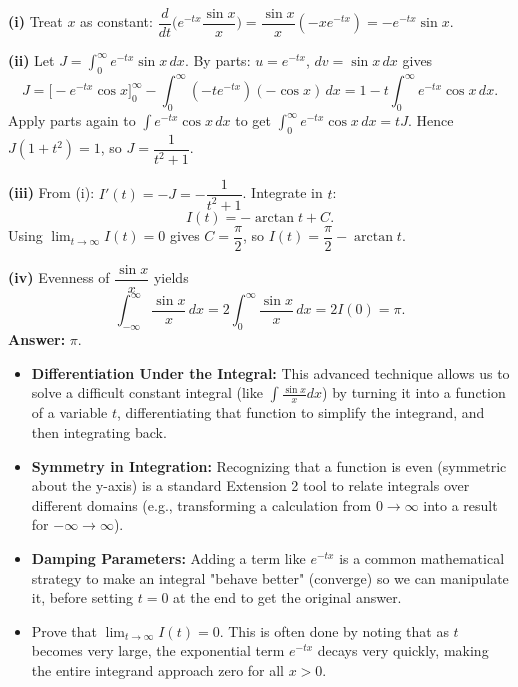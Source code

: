 \begin{solution}
	\textbf{(i)} Treat $x$ as constant: $\dfrac{d}{dt}\Big(e^{-tx}\dfrac{\sin x}{x}\Big) = \dfrac{\sin x}{x}(-x e^{-tx}) = -e^{-tx}\sin x$.

	\textbf{(ii)} Let $J=\int_{0}^{\infty} e^{-tx}\sin x\,dx$. By parts: $u=e^{-tx}$, $dv=\sin x\,dx$ gives
\[
J = \big[-e^{-tx}\cos x\big]_0^{\infty} - \int_0^{\infty}(-t e^{-tx})(-\cos x)\,dx = 1 - t\int_0^{\infty} e^{-tx}\cos x\,dx.
\]
Apply parts again to $\int e^{-tx}\cos x\,dx$ to get $\int_0^{\infty} e^{-tx}\cos x\,dx = tJ$. Hence $J(1+t^2)=1$, so $\boxed{J=\dfrac{1}{t^2+1}}$.

	\textbf{(iii)} From (i): $I'(t)=-J=-\dfrac{1}{t^2+1}$. Integrate in $t$:
\[
I(t) = -\arctan t + C.
\]
Using $\lim_{t\to\infty} I(t)=0$ gives $C=\dfrac{\pi}{2}$, so $\boxed{I(t)=\dfrac{\pi}{2}-\arctan t}$.

	\textbf{(iv)} Evenness of $\dfrac{\sin x}{x}$ yields
\[
\int_{-\infty}^{\infty}\frac{\sin x}{x}\,dx = 2\int_0^{\infty}\frac{\sin x}{x}\,dx = 2I(0) = \pi.
\]
	\textbf{Answer:} $\boxed{\pi}$.
\end{solution}

\begin{takeaways}

\begin{itemize}
    \item \textbf{Differentiation Under the Integral:} This advanced technique allows us to solve a difficult constant integral (like $\int \frac{\sin x}{x} dx$) by turning it into a function of a variable $t$, differentiating that function to simplify the integrand, and then integrating back.
    \item \textbf{Symmetry in Integration:} Recognizing that a function is even (symmetric about the y-axis) is a standard Extension 2 tool to relate integrals over different domains (e.g., transforming a calculation from $0 \to \infty$ into a result for $-\infty \to \infty$).
    \item \textbf{Damping Parameters:} Adding a term like $e^{-tx}$ is a common mathematical strategy to make an integral "behave better" (converge) so we can manipulate it, before setting $t=0$ at the end to get the original answer.
    \item Prove that $\lim_{t \to \infty} I(t) = 0$. This is often done by noting that as $t$ becomes very large, the exponential term $e^{-tx}$ decays very quickly, making the entire integrand approach zero for all $x > 0$.
\end{itemize}

\end{takeaways}
